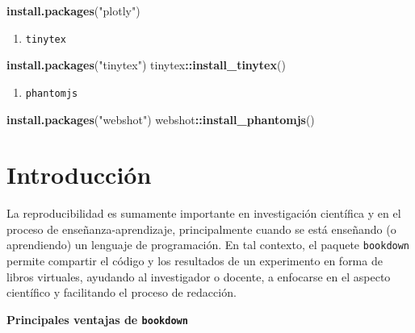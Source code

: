 \documentclass[
]{book}
\newenvironment{Shaded}{\begin{snugshade}}{\end{snugshade}}
\newcommand{\KeywordTok}[1]{\textcolor[rgb]{0.13,0.29,0.53}{\textbf{#1}}}
\newcommand{\NormalTok}[1]{#1}
\newcommand{\OperatorTok}[1]{\textcolor[rgb]{0.81,0.36,0.00}{\textbf{#1}}}
\newcommand{\StringTok}[1]{\textcolor[rgb]{0.31,0.60,0.02}{#1}}
\providecommand{\tightlist}{%
  \setlength{\itemsep}{0pt}\setlength{\parskip}{0pt}}
\begin{document}
\begin{Shaded}
\begin{Highlighting}[]
\KeywordTok{install.packages}\NormalTok{(}\StringTok{"plotly"}\NormalTok{)}
\end{Highlighting}
\end{Shaded}

\begin{enumerate}
\def\labelenumi{\arabic{enumi}.}
\setcounter{enumi}{6}
\tightlist
\item
  \texttt{tinytex}
\end{enumerate}

\begin{Shaded}
\begin{Highlighting}[]
\KeywordTok{install.packages}\NormalTok{(}\StringTok{"tinytex"}\NormalTok{)}
\NormalTok{tinytex}\OperatorTok{::}\KeywordTok{install_tinytex}\NormalTok{()}
\end{Highlighting}
\end{Shaded}

\begin{enumerate}
\def\labelenumi{\arabic{enumi}.}
\setcounter{enumi}{7}
\tightlist
\item
  \texttt{phantomjs}
\end{enumerate}

\begin{Shaded}
\begin{Highlighting}[]
\KeywordTok{install.packages}\NormalTok{(}\StringTok{"webshot"}\NormalTok{)}
\NormalTok{webshot}\OperatorTok{::}\KeywordTok{install_phantomjs}\NormalTok{()}
\end{Highlighting}
\end{Shaded}

\hypertarget{intro}{%
\chapter{Introducción}\label{intro}}

La reproducibilidad es sumamente importante en investigación científica y en el proceso de enseñanza-aprendizaje, principalmente cuando se está enseñando (o aprendiendo) un lenguaje de programación. En tal contexto, el paquete \texttt{bookdown} permite compartir el código y los resultados de un experimento en forma de libros virtuales, ayudando al investigador o docente, a enfocarse en el aspecto científico y facilitando el proceso de redacción.

\textbf{Principales ventajas de \texttt{bookdown}}
\end{document}
